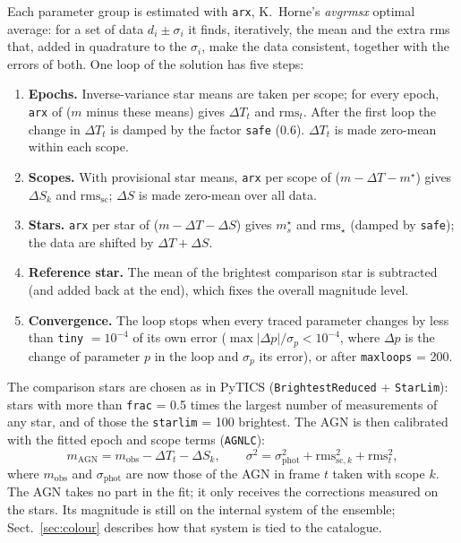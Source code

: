 \documentclass[10pt,a4paper,oneside]{report}
\renewcommand{\_}{\oldunderscore\allowbreak}
\begin{document}
Each parameter group is estimated with \texttt{arx}, K.~Horne's \emph{avgrmsx} optimal average: for a
set of data $d_i\pm\sigma_i$ it finds, iteratively, the mean and the extra rms that, added in
quadrature to the $\sigma_i$, make the data consistent, together with the errors of both. One loop of
the solution has five steps:
\begin{enumerate}
  \item \textbf{Epochs.} Inverse-variance star means are taken per scope; for every epoch,
        \texttt{arx} of ($m$ minus these means) gives $\Delta T_t$ and $\mathrm{rms}_t$. After the
        first loop the change in $\Delta T_t$ is damped by the factor \texttt{safe} (0.6).
        $\Delta T_t$ is made zero-mean within each scope.
  \item \textbf{Scopes.} With provisional star means, \texttt{arx} per scope of
        ($m - \Delta T - m^\star$) gives $\Delta S_k$ and $\mathrm{rms}_\mathrm{sc}$; $\Delta S$ is made
        zero-mean over all data.
  \item \textbf{Stars.} \texttt{arx} per star of ($m - \Delta T - \Delta S$) gives $m^\star_s$ and
        $\mathrm{rms}_\star$ (damped by \texttt{safe}); the data are shifted by $\Delta T + \Delta S$.
  \item \textbf{Reference star.} The mean of the brightest comparison star is subtracted (and added
        back at the end), which fixes the overall magnitude level.
  \item \textbf{Convergence.} The loop stops when every traced parameter changes by less than
        \texttt{tiny} $=10^{-4}$ of its own error ($\max|\Delta p|/\sigma_p<10^{-4}$, where $\Delta p$ is
        the change of parameter $p$ in the loop and $\sigma_p$ its error), or after \texttt{max\_loops} = 200.
\end{enumerate}
The comparison stars are chosen as in PyTICS (\texttt{Brightest\_Reduced} + \texttt{Star\_Lim}): stars
with more than \texttt{frac} = 0.5 times the largest number of measurements of any star, and of
those the \texttt{star\_lim} = 100 brightest. The AGN is then calibrated with the fitted epoch and
scope terms (\texttt{AGN\_LC}):
\begin{equation}
  m_\mathrm{AGN} = m_\mathrm{obs} - \Delta T_t - \Delta S_k ,
  \qquad
  \sigma^2 = \sigma_\mathrm{phot}^2 + \mathrm{rms}_{\mathrm{sc},k}^2 + \mathrm{rms}_t^2 ,
\end{equation}
where $m_\mathrm{obs}$ and $\sigma_\mathrm{phot}$ are now those of the AGN in frame $t$ taken with scope
$k$. The AGN takes no part in the fit; it only receives the corrections measured on the stars. Its
magnitude is still on the internal system of the ensemble; Sect.~\ref{sec:colour} describes how that
system is tied to the catalogue.
\end{document}
